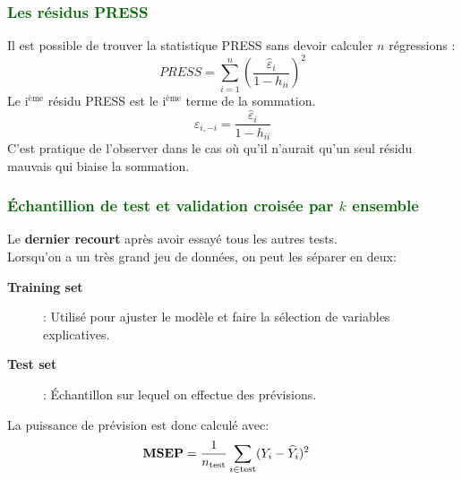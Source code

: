 \documentclass[10pt, french]{article}
\begin{document}
\begin{multicols*}{3}
\subsubsection*{\textcolor{darkgreen}{Les résidus PRESS}}
	Il est possible de trouver la statistique PRESS sans devoir calculer $n$ régressions :
	\[ PRESS = \sum_{i=1}^n \left( \frac{\hat{\varepsilon}_i}{1 - h_{ii}} \right)^2 \]
	Le i$^{\text{ème}}$ résidu PRESS est le i$^{\text{ème}}$ terme de la sommation. 
	\[
	\widehat{\varepsilon}_{i, -i} = \frac{\widehat{\varepsilon}_{i}}{1 - h_{ii}}
	\]	
	C'est pratique de l'observer dans le cas où qu'il n'aurait qu'un seul résidu mauvais qui biaise la sommation.

\subsubsection*{\textcolor{darkgreen}{Échantillion de test et validation croisée par $k$ ensemble}}
Le \textbf{dernier recourt} après avoir essayé tous les autres tests.\\
Lorsqu'on a un très grand jeu de données, on peut les séparer en deux: 
\begin{description}
	\item[\textbf{Training set}]: Utilisé pour ajuster le modèle et faire la sélection de variables explicatives.
	\item[\textbf{Test set}]: Échantillon sur lequel on effectue des prévisions.
\end{description}
La puissance de prévision est donc calculé avec:
\begin{align*}
	\text{\textbf{MSEP}} &= \frac{1}{n_{\text{test}}} \sum_{i \in \text{test}} (Y_{i} - \widehat{Y}_{i})^{2}
\end{align*}


\end{multicols*}
\end{document}
